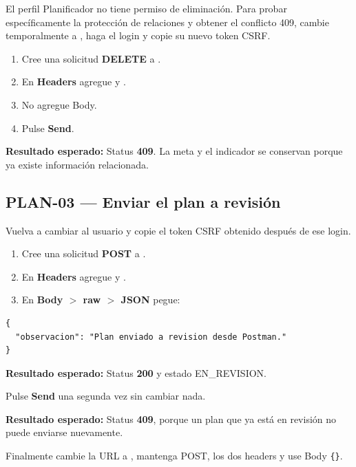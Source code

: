 \documentclass[11pt,a4paper]{article}
\newcommand{\esperado}[1]{\textcolor{VerdeResultado}{\textbf{Resultado esperado:}} #1}
\begin{document}
El perfil Planificador no tiene permiso de eliminación. Para probar específicamente la protección de relaciones y obtener el conflicto 409, cambie temporalmente a , haga el login y copie su nuevo token CSRF.

\begin{enumerate}
  \item Cree una solicitud \textbf{DELETE} a .
  \item En \textbf{Headers} agregue  y .
  \item No agregue Body.
  \item Pulse \textbf{Send}.
\end{enumerate}

\esperado{Status \textbf{409}. La meta y el indicador se conservan porque ya existe información relacionada.}

\subsection{PLAN-03 --- Enviar el plan a revisión}

Vuelva a cambiar al usuario  y copie el token CSRF obtenido después de ese login.

\begin{enumerate}
  \item Cree una solicitud \textbf{POST} a .
  \item En \textbf{Headers} agregue  y .
  \item En \textbf{Body $>$ raw $>$ JSON} pegue:
\end{enumerate}

\begin{lstlisting}
{
  "observacion": "Plan enviado a revision desde Postman."
}
\end{lstlisting}

\esperado{Status \textbf{200} y estado EN\_REVISION.}

Pulse \textbf{Send} una segunda vez sin cambiar nada.

\esperado{Status \textbf{409}, porque un plan que ya está en revisión no puede enviarse nuevamente.}

Finalmente cambie la URL a , mantenga POST, los dos headers y use Body \texttt{\{\}}.
\end{document}
